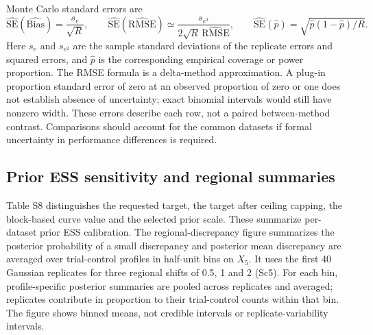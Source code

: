Monte Carlo standard errors are
\begin{equation}
\widehat{\mathrm{SE}}(\widehat{\mathrm{Bias}})=\frac{s_e}{\sqrt R},\qquad
\widehat{\mathrm{SE}}(\widehat{\mathrm{RMSE}})\simeq
\frac{s_{e^2}}{2\sqrt R\,\widehat{\mathrm{RMSE}}},\qquad
\widehat{\mathrm{SE}}(\widehat p)=\sqrt{\widehat p(1-\widehat p)/R}.
\end{equation}
Here $s_e$ and $s_{e^2}$ are the sample standard deviations of the replicate errors and squared errors, and $\widehat p$ is the corresponding empirical coverage or power proportion. The RMSE formula is a delta-method approximation. A plug-in proportion standard error of zero at an observed proportion of zero or one does not establish absence of uncertainty; exact binomial intervals would still have nonzero width. These errors describe each row, not a paired between-method contrast. Comparisons should account for the common datasets if formal uncertainty in performance differences is required.


\clearpage

\clearpage

\clearpage

\clearpage
\subsection{Prior ESS sensitivity and regional summaries}\label{sec:E.6}
Table S8 distinguishes the requested target, the target after ceiling capping, the block-based curve value and the selected prior scale. These summarize per-dataset prior ESS calibration. The regional-discrepancy figure summarizes the posterior probability of a small discrepancy and posterior mean discrepancy are averaged over trial-control profiles in half-unit bins on $X_5$. It uses the first 40 Gaussian replicates for three regional shifts of 0.5, 1 and 2 (Sc5). For each bin, profile-specific posterior summaries are pooled across replicates and averaged; replicates contribute in proportion to their trial-control counts within that bin. The figure shows binned means, not credible intervals or replicate-variability intervals.

\clearpage
